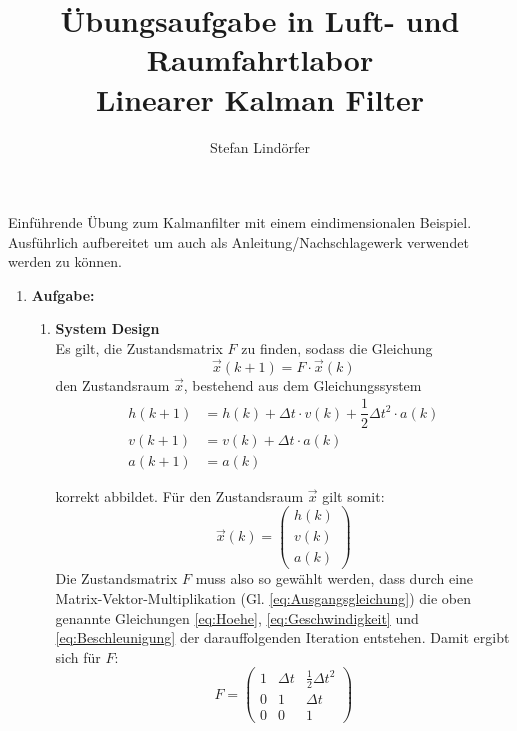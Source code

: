 \documentclass[12pt,a4paper]{article}
\begin{document}
	\title{Übungsaufgabe in Luft- und Raumfahrtlabor\\Linearer Kalman Filter}
	\author{Stefan Lindörfer}
	\maketitle{}
Einführende Übung zum Kalmanfilter mit einem eindimensionalen Beispiel. Ausführlich aufbereitet um auch als Anleitung/Nachschlagewerk verwendet werden zu können.
	\begin{enumerate}[label=\textbf{\arabic*})] %
		\item \textbf{Aufgabe:}\label{sub:Aufgabe1}\\
		
		\begin{enumerate}[label=\textbf{\alph*})] %
			\item \textbf{System Design}\label{subsec:Task1a}\\
			Es gilt, die Zustandsmatrix $F$ zu finden, sodass die Gleichung
			\begin{equation}\label{eq:Ausgangsgleichung}
				\vec{x}(k+1)=F\cdot \vec{x}(k)
			\end{equation}
			den Zustandsraum $\vec{x}$, bestehend aus dem Gleichungssystem		
			\begin{align}
				h(k+1)&=h(k)+\Delta t\cdot v(k) + \dfrac{1}{2}\Delta t^{2}\cdot a(k)\label{eq:Hoehe}\\
				v(k+1)&=v(k)+\Delta t\cdot a(k)\label{eq:Geschwindigkeit}\\
				a(k+1)&=a(k)\label{eq:Beschleunigung}
			\end{align}
			
			
    		korrekt abbildet. Für den Zustandsraum $\vec{x}$ gilt somit:
    		\begin{equation}\label{eq:Zustandsraum}
				\vec{x}(k)=
				\begin{pmatrix}
					h(k)\\
					v(k)\\
					a(k)
				\end{pmatrix}
    		\end{equation}
    		Die Zustandsmatrix $F$ muss also so gewählt werden, dass durch eine Matrix-Vektor-Multiplikation (Gl. \ref{eq:Ausgangsgleichung}) die oben genannte Gleichungen \ref{eq:Hoehe}, \ref{eq:Geschwindigkeit} und \ref{eq:Beschleunigung} der darauffolgenden Iteration entstehen. Damit ergibt sich für $F$:\\
			\begin{equation}\label{eq:ZustandsmatrixF}
			F =
			\begin{pmatrix}
				1 & \Delta t & \frac{1}{2}\Delta t^{2} \\
				0 & 1 & \Delta t \\
				0 & 0 & 1
			\end{pmatrix}		
			\end{equation}
			

\end{enumerate}
\end{enumerate}
\end{document}

